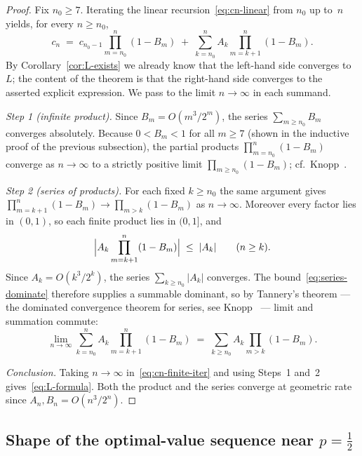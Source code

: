 \documentclass[reqno,final,11pt]{amsart}
\theoremstyle{plain}
\theoremstyle{definition}
\theoremstyle{remark}
\begin{document}
\begin{proof}
  Fix $n_0\ge 7$.  Iterating the linear
  recursion~\eqref{eq:cn-linear} from $n_0$ up to~$n$ yields, for
  every $n\ge n_0$,
  \begin{equation}\label{eq:cn-finite-iter}
    c_n \;=\; c_{n_0-1}\prod_{m=n_0}^n(1-B_m)
        \;+\; \sum_{k=n_0}^n A_k\prod_{m=k+1}^n(1-B_m).
  \end{equation}
  By Corollary~\ref{cor:L-exists} we already know that the
  left-hand side converges to~$L$; the content of the theorem is
  that the right-hand side converges to the asserted explicit
  expression.  We pass to the limit $n\to\infty$ in each summand.

  \emph{Step 1 (infinite product).}  Since $B_m=O(m^3/2^m)$, the
  series $\sum_{m\ge n_0}B_m$ converges absolutely.  Because
  $0<B_m<1$ for all $m\ge 7$ (shown in the inductive proof of
  the previous subsection), the partial products
  $\prod_{m=n_0}^n(1-B_m)$ converge as $n\to\infty$ to a strictly
  positive limit $\prod_{m\ge n_0}(1-B_m)$; cf.\ Knopp~\citeyearpar[\S 29]{Knopp1990}.

  \emph{Step 2 (series of products).}  For each fixed $k\ge n_0$
  the same argument gives
  $\prod_{m=k+1}^n(1-B_m)\to\prod_{m>k}(1-B_m)$ as $n\to\infty$.
  Moreover every factor lies in $(0,1)$, so each finite product
  lies in $(0,1]$, and
  \begin{equation}\label{eq:series-dominate}
    \Bigl|A_k\prod_{m=k+1}^n(1-B_m)\Bigr|\;\le\;|A_k|
    \qquad(n\ge k).
  \end{equation}
  Since $A_k=O(k^3/2^k)$, the series $\sum_{k\ge n_0}|A_k|$
  converges.  The bound~\eqref{eq:series-dominate} therefore supplies
  a summable dominant, so by Tannery's theorem — the dominated
  convergence theorem for series, see Knopp~\citeyearpar[\S 41]{Knopp1990} ---
  limit and summation commute:
  \[
    \lim_{n\to\infty}\sum_{k=n_0}^n A_k\prod_{m=k+1}^n(1-B_m)
    \;=\; \sum_{k\ge n_0}A_k\prod_{m>k}(1-B_m).
  \]

  \emph{Conclusion.}  Taking $n\to\infty$ in~\eqref{eq:cn-finite-iter}
  and using Steps~1 and~2 gives~\eqref{eq:L-formula}.  Both the
  product and the series converge at geometric rate
  since $A_n,B_n=O(n^3/2^n)$.
\end{proof}

\subsection{Shape of the optimal-value sequence near
  \texorpdfstring{$p=\tfrac12$}{p=1/2}}
\end{document}
